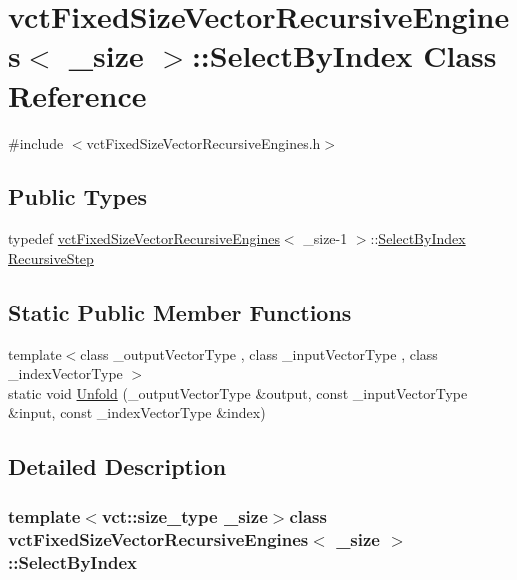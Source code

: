 \hypertarget{classvct_fixed_size_vector_recursive_engines_1_1_select_by_index}{}\section{vct\+Fixed\+Size\+Vector\+Recursive\+Engines$<$ \+\_\+size $>$\+:\+:Select\+By\+Index Class Reference}
\label{classvct_fixed_size_vector_recursive_engines_1_1_select_by_index}


{\ttfamily \#include $<$vct\+Fixed\+Size\+Vector\+Recursive\+Engines.\+h$>$}

\subsection*{Public Types}
\begin{DoxyCompactItemize}
\item 
typedef \hyperlink{classvct_fixed_size_vector_recursive_engines}{vct\+Fixed\+Size\+Vector\+Recursive\+Engines}$<$ \+\_\+size-\/1 $>$\+::\hyperlink{classvct_fixed_size_vector_recursive_engines_1_1_select_by_index}{Select\+By\+Index} \hyperlink{classvct_fixed_size_vector_recursive_engines_1_1_select_by_index_a1a6c0ae1c4db3cad550f893bf47e665d}{Recursive\+Step}
\end{DoxyCompactItemize}
\subsection*{Static Public Member Functions}
\begin{DoxyCompactItemize}
\item 
{\footnotesize template$<$class \+\_\+output\+Vector\+Type , class \+\_\+input\+Vector\+Type , class \+\_\+index\+Vector\+Type $>$ }\\static void \hyperlink{classvct_fixed_size_vector_recursive_engines_1_1_select_by_index_a498a40173f3e88a9599175fa2bd30dff}{Unfold} (\+\_\+output\+Vector\+Type \&output, const \+\_\+input\+Vector\+Type \&input, const \+\_\+index\+Vector\+Type \&index)
\end{DoxyCompactItemize}


\subsection{Detailed Description}
\subsubsection*{template$<$vct\+::size\+\_\+type \+\_\+size$>$class vct\+Fixed\+Size\+Vector\+Recursive\+Engines$<$ \+\_\+size $>$\+::\+Select\+By\+Index}

